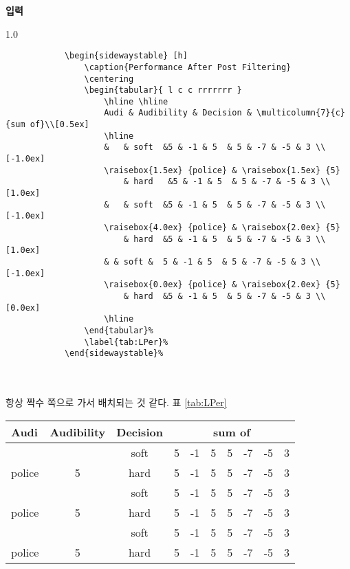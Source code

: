 	\singlespacing
	\textbf{입력}\\
		\begin{boxedminipage}[t]{1.0\linewidth}
		\small
		\begin{verbatim}	
			\begin{sidewaystable} [h]
				\caption{Performance After Post Filtering}
				\centering
				\begin{tabular}{ l c c rrrrrrr }
					\hline \hline
					Audi & Audibility & Decision & \multicolumn{7}{c}{sum of}\\[0.5ex]
					\hline
					& 	& soft 	&5 & -1 & 5  & 5 & -7 & -5 & 3 \\[-1.0ex]
					\raisebox{1.5ex} {police} & \raisebox{1.5ex} {5} 
						& hard   &5 & -1 & 5  & 5 & -7 & -5 & 3 \\[1.0ex]
					& 	& soft 	&5 & -1 & 5  & 5 & -7 & -5 & 3 \\[-1.0ex]
					\raisebox{4.0ex} {police} & \raisebox{2.0ex} {5} 
						& hard	&5 & -1 & 5  & 5 & -7 & -5 & 3 \\[1.0ex]
					& & soft &  5 & -1 & 5  & 5 & -7 & -5 & 3 \\[-1.0ex]
					\raisebox{0.0ex} {police} & \raisebox{2.0ex} {5} 
						& hard	&5 & -1 & 5  & 5 & -7 & -5 & 3 \\[0.0ex]
					\hline
				\end{tabular}%
				\label{tab:LPer}%
			\end{sidewaystable}%
		\end{verbatim} 
		\end{boxedminipage} \\ \\


		항상 짝수 쪽으로 가서 배치되는 것 같다.
	표 \ref{tab:LPer}
	
	\doublespacing
	\newpage
			\begin{sidewaystable} [h]
				\caption{Performance After Post Filtering}
				\centering
				\begin{tabular}{ l c c rrrrrrr }
					\hline \hline
					Audi & Audibility & Decision & \multicolumn{7}{c}{sum of}\\[0.5ex]
					\hline
					& 	& soft 	&5 & -1 & 5  & 5 & -7 & -5 & 3 \\[-1.0ex]
					\raisebox{1.5ex} {police} & \raisebox{1.5ex} {5} 
						& hard   &5 & -1 & 5  & 5 & -7 & -5 & 3 \\[1.0ex]
					& 	& soft 	&5 & -1 & 5  & 5 & -7 & -5 & 3 \\[-1.0ex]
					\raisebox{4.0ex} {police} & \raisebox{2.0ex} {5} 
						& hard	&5 & -1 & 5  & 5 & -7 & -5 & 3 \\[1.0ex]
					& & soft &  5 & -1 & 5  & 5 & -7 & -5 & 3 \\[-1.0ex]
					\raisebox{0.0ex} {police} & \raisebox{2.0ex} {5} 
						& hard	&5 & -1 & 5  & 5 & -7 & -5 & 3 \\[0.0ex]
					\hline
				\end{tabular}%
				\label{tab:LPer}%
			\end{sidewaystable}%





